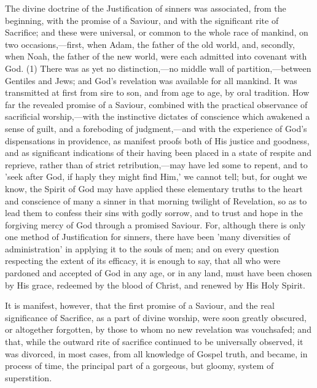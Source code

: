 \documentclass[
]{book}
\begin{document}
The divine doctrine of the Justification of sinners was associated, from the beginning, with the promise of a Saviour, and with the significant rite of Sacrifice; and these were universal, or common to the whole race of mankind, on two occasions,---first, when Adam, the father of the old world, and, secondly, when Noah, the father of the new world, were each admitted into covenant with God. (1) There was as yet no distinction,---no middle wall of partition,---between Gentiles and Jews; and God's revelation was available for all mankind. It was transmitted at first from sire to son, and from age to age, by oral tradition. How far the revealed promise of a Saviour, combined with the practical observance of sacrificial worship,---with the instinctive dictates of conscience which awakened a sense of guilt, and a foreboding of judgment,---and with the experience of God's dispensations in providence, as manifest proofs both of His justice and goodness, and as significant indications of their having been placed in a state of respite and reprieve, rather than of strict retribution,---may have led some to repent, and to 'seek after God, if haply they might find Him,' we cannot tell; but, for ought we know, the Spirit of God may have applied these elementary truths to the heart and conscience of many a sinner in that morning twilight of Revelation, so as to lead them to confess their sins with godly sorrow, and to trust and hope in the forgiving mercy of God through a promised Saviour. For, although there is only one method of Justification for sinners, there have been 'many diversities of administration' in applying it to the souls of men; and on every question respecting the extent of its efficacy, it is enough to say, that all who were pardoned and accepted of God in any age, or in any land, must have been chosen by His grace, redeemed by the blood of Christ, and renewed by His Holy Spirit.

It is manifest, however, that the first promise of a Saviour, and the real significance of Sacrifice, as a part of divine worship, were soon greatly obscured, or altogether forgotten, by those to whom no new revelation was vouchsafed; and that, while the outward rite of sacrifice continued to be universally observed, it was divorced, in most cases, from all knowledge of Gospel truth, and became, in process of time, the principal part of a gorgeous, but gloomy, system of superstition.
\end{document}

